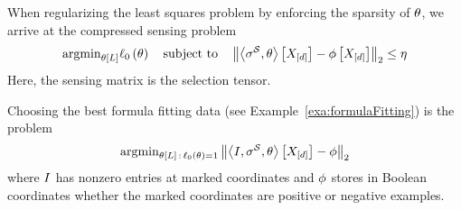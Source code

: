 







When regularizing the least squares problem by enforcing the sparsity of $\theta$, we arrive at the compressed sensing problem
\begin{align}
	\mathrm{argmin}_{\theta\left[L\right]} \ell_0\left(\theta\right) 
	\quad \text{subject to} \quad
	\left\| \left\langle \sigma^{\mathcal{S}},\theta\right\rangle \left[ X_{[d]} \right] - \phi\left[X_{[d]}\right] \right\|_2 \leq \eta
\end{align}
Here, the sensing matrix is the selection tensor.


\begin{example}
	Choosing the best formula fitting data (see Example~\ref{exa:formulaFitting}) is the problem
	\begin{align}
	\mathrm{argmin}_{\theta\left[L\right]\, : \,  \ell_0\left(\theta\right)=1} \left\| \left\langle I,\sigma^{\mathcal{S}},\theta\right\rangle \left[ X_{[d]} \right] - \phi \right\|_2 
	\end{align}
	where $I$ has nonzero entries at marked coordinates and $\phi$ stores in Boolean coordinates whether the marked coordinates are positive or negative examples.
\end{example}

